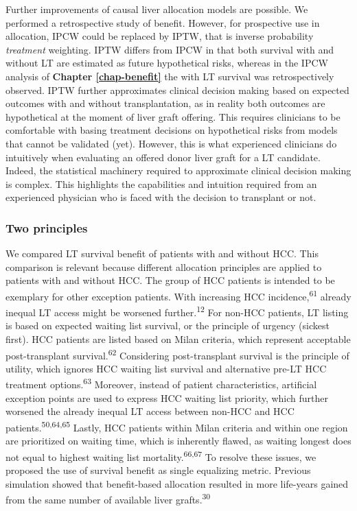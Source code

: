 \documentclass[11pt,english,]{book} %
\begin{document}
Further improvements of causal liver allocation models are possible. We performed a retrospective study of benefit. However, for prospective use in allocation, IPCW could be replaced by IPTW, that is inverse probability \emph{treatment} weighting. IPTW differs from IPCW in that both survival with and without LT are estimated as future hypothetical risks, whereas in the IPCW analysis of \textbf{Chapter \ref{chap-benefit}} the with LT survival was retrospectively observed. IPTW further approximates clinical decision making based on expected outcomes with and without transplantation, as in reality both outcomes are hypothetical at the moment of liver graft offering. This requires clinicians to be comfortable with basing treatment decisions on hypothetical risks from models that cannot be validated (yet). However, this is what experienced clinicians do intuitively when evaluating an offered donor liver graft for a LT candidate. Indeed, the statistical machinery required to approximate clinical decision making is complex. This highlights the capabilities and intuition required from an experienced physician who is faced with the decision to transplant or not.

\hypertarget{two-principles}{%
\subsubsection*{Two principles}\label{two-principles}}

We compared LT survival benefit of patients with and without HCC. This comparison is relevant because different allocation principles are applied to patients with and without HCC. The group of HCC patients is intended to be exemplary for other exception patients. With increasing HCC incidence,\textsuperscript{61} already inequal LT access might be worsened further.\textsuperscript{12} For non-HCC patients, LT listing is based on expected waiting list survival, or the principle of urgency (sickest first). HCC patients are listed based on Milan criteria, which represent acceptable post-transplant survival.\textsuperscript{62} Considering post-transplant survival is the principle of utility, which ignores HCC waiting list survival and alternative pre-LT HCC treatment options.\textsuperscript{63} Moreover, instead of patient characteristics, artificial exception points are used to express HCC waiting list priority, which further worsened the already inequal LT access between non-HCC and HCC patients.\textsuperscript{50,64,65} Lastly, HCC patients within Milan criteria and within one region are prioritized on waiting time, which is inherently flawed, as waiting longest does not equal to highest waiting list mortality.\textsuperscript{66,67} To resolve these issues, we proposed the use of survival benefit as single equalizing metric. Previous simulation showed that benefit-based allocation resulted in more life-years gained from the same number of available liver grafts.\textsuperscript{30}
\end{document}
